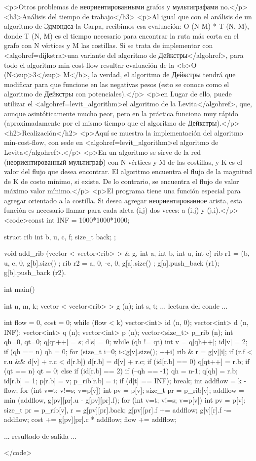 <p>Otros problemas de неориентированными grafos y мультиграфами no.</p>
<h3>Análisis del tiempo de trabajo</h3>
<p>Al igual que con el análisis de un algoritmo de Эдмондса-la Carpa, recibimos esa evaluación: O (N M) * T (N, M), donde T (N, M) es el tiempo necesario para encontrar la ruta más corta en el grafo con N vértices y M las costillas. Si se trata de implementar con <algohref=dijkstra>una variante del algoritmo de Дейкстры</algohref>, para todo el algoritmo min-cost-flow resultar evaluación de la <b>O (N<sup>3</sup> M</b>, la verdad, el algoritmo de Дейкстры tendrá que modificar para que funcione en las negativas pesos (esto se conoce como el algoritmo de Дейкстры con potenciales).</p>
<p>en Lugar de ello, puede utilizar el <algohref=levit_algorithm>el algoritmo de la Levita</algohref>, que, aunque asintóticamente mucho peor, pero en la práctica funciona muy rápido (aproximadamente por el mismo tiempo que el algoritmo de Дейкстры).</p>
<h2>Realización</h2>
<p>Aquí se muestra la implementación del algoritmo min-cost-flow, con sede en <algohref=levit_algorithm>el algoritmo de Levita</algohref>.</p>
<p>En un algoritmo se sirve de la red (неориентированный мультиграф) con N vértices y M de las costillas, y K es el valor del flujo que desea encontrar. El algoritmo encuentra el flujo de la magnitud de K de costo mínimo, si existe. De lo contrario, se encuentra el flujo de valor máximo valor mínimo.</p>
<p>El programa tiene una función especial para agregar orientado a la costilla. Si desea agregar неориентированное arista, esta función es necesario llamar para cada aleta (i,j) dos veces: a (i,j) y (j,i).</p>
<code>const int INF = 1000*1000*1000;

struct rib {
int b, u, c, f;
size_t back;
};

void add_rib (vector < vector<rib> > & g, int a, int b, int u, int c) {
rib r1 = {(b, u, c, 0, g[b].size() };
rib r2 = { a, 0, -c, 0, g[a].size() };
g[a].push_back (r1);
g[b].push_back (r2).
}

int main()
{
int n, m, k;
vector < vector<rib> > g (n);
int s, t;
... lectura del conde ...

int flow = 0, cost = 0;
while (flow < k) {
vector<int> id (n, 0);
vector<int> d (n, INF);
vector<int> q (n);
vector<int> p (n);
vector<size_t> p_rib (n);
int qh=0, qt=0;
q[qt++] = s;
d[s] = 0;
while (qh != qt) {
int v = q[qh++];
id[v] = 2;
if (qh == n) qh = 0;
for (size_t i=0; i<g[v].size(); ++i) {
rib & r = g[v][i];
if (r.f < r.u && d[v] + r.c < d[r.b]) {
d[r.b] = d[v] + r.c;
if (id[r.b] == 0) {
q[qt++] = r.b;
if (qt == n) qt = 0;
}
else if (id[r.b] == 2) {
if (--qh == -1) qh = n-1;
q[qh] = r.b;
}
id[r.b] = 1;
p[r.b] = v;
p_rib[r.b] = i;
}
}
}
if (d[t] == INF); break;
int addflow = k - flow;
for (int v=t; v!=s; v=p[v]) {
int pv = p[v]; size_t pr = p_rib[v];
addflow = min (addflow, g[pv][pr].u - g[pv][pr].f);
}
for (int v=t; v!=s; v=p[v]) {
int pv = p[v]; size_t pr = p_rib[v], r = g[pv][pr].back;
g[pv][pr].f += addflow;
g[v][r].f -= addflow;
cost += g[pv][pr].c * addflow;
}
flow += addflow;
}

... resultado de salida ...

}</code>